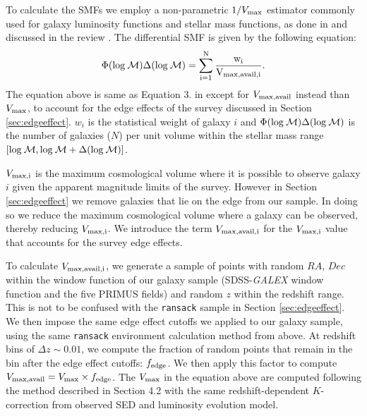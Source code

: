 \documentclass{emulateapj}
\begin{document}
To calculate the SMFs we employ a non-parametric $1/{V_{\rm{max}}}$ estimator commonly used for galaxy luminosity functions and stellar mass functions, as done in \cite{Moustakas:2013aa} and discussed in the review \cite{Johnston:2011aa}. The differential SMF is given by the following equation:
\begin{equation} \label{eq:phi}
\Phi(\rm{log}\: \mathcal{M}) \Delta(\rm{log} \:\mathcal{M}) = \sum\limits_{i=1}^{N} \frac{w_i}{V_{\rm{max,avail},i}}. 
\end{equation}
The equation above is same as Equation 3. in \cite{Moustakas:2013aa} except for $V_{\rm{max,avail}}$ instead than $V_{\rm{max}}$, to account for the edge effects of the survey discussed in Section \ref{sec:edgeeffect}. $w_i$ is the statistical weight of galaxy $i$ and $\Phi(\rm{log}\: \mathcal{M}) \Delta(\rm{log}\: \mathcal{M})$ is the number of galaxies ($N$) per unit volume within the stellar mass range $[\rm{log} \:\mathcal{M}, \rm{log} \:\mathcal{M}+\Delta(\rm{log} \:\mathcal{M})]$.

$V_{\rm{max},i}$ is the maximum cosmological volume where it is possible to observe galaxy $i$ given the apparent magnitude limits of the survey. However in Section \ref{sec:edgeeffect} we remove galaxies that lie on the edge from our sample. In doing so we reduce the maximum cosmological volume where a galaxy can be observed, thereby reducing $V_{\rm{max},i}$. We introduce the term $V_{\rm{max,avail},i}$ for the $V_{\rm{max},i}$ value that accounts for the survey edge effects. 

To calculate $V_{\rm{max,avail},i}$, we generate a sample of points with random $RA$, $Dec$ within the window function of our galaxy sample (SDSS-{\em GALEX} window function and the five PRIMUS fields) and random $z$ within the redshift range. This is not to be confused with the \texttt{ransack} sample in Section \ref{sec:edgeeffect}. We then impose the same edge effect cutoffs we applied to our galaxy sample, using the same \texttt{ransack} environment calculation method from above. At redshift bins of $\Delta z \sim 0.01$, we compute the fraction of random points that remain in the bin after the edge effect cutoffs: $f_{\rm{edge}}$. We then apply this factor to compute $V_{\rm{max,avail}} = V_{\rm{max}} \times f_{\rm{edge}}$. The $V_{\rm{max}}$ in the equation above are computed following the method described in \cite{Moustakas:2013aa} Section 4.2 with the same redshift-dependent $K$-correction from observed SED and luminosity evolution model.
\end{document}

